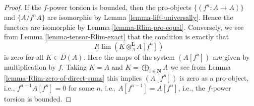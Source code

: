 \documentclass[10pt,a4paper]{amsart}
\theoremstyle{plain}
\theoremstyle{definition}
\theoremstyle{remark}
\numberwithin{equation}{subsection}
\def\lim{\mathop{\mathrm{lim}}\nolimits}
\begin{document}
\begin{proof}
If the $f$-power torsion is bounded, then the pro-objects
$\{(f^n : A \to A)\}$ and $\{A/f^nA\}$ are isomorphic by
Lemma \ref{lemma-lift-universally}.
Hence the functors are isomorphic by Lemma \ref{lemma-Rlim-pro-equal}.
Conversely, we see from Lemma \ref{lemma-tensor-Rlim-exact}
that the condition is exactly that
$$
R\lim (K \otimes_A^\mathbf{L} A[f^n])
$$
is zero for all $K \in D(A)$. Here the maps of the system $(A[f^n])$
are given by multiplication by $f$. Taking $K = A$ and
$K = \bigoplus_{i \in \mathbf{N}} A$ we see from
Lemma \ref{lemma-Rlim-zero-of-direct-sums}
this implies $(A[f^n])$ is zero as a pro-object, i.e.,
$f^{n - 1}A[f^n] = 0$ for some $n$, i.e., $A[f^{n - 1}] = A[f^n]$, i.e.,
the $f$-power torsion is bounded.
\end{proof}
\end{document}
